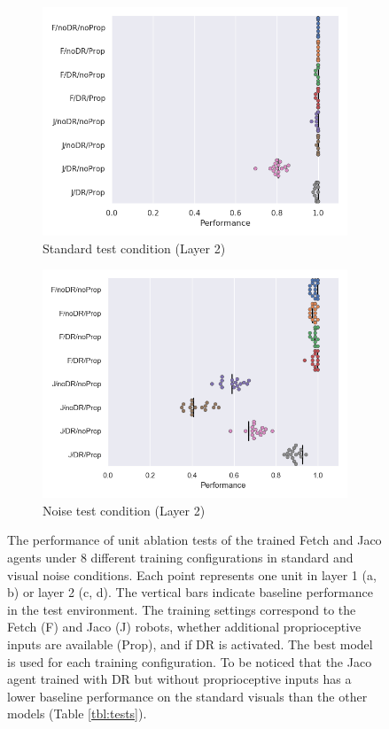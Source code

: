 \begin{figure}[h!]
  \begin{subfigure}{0.49\linewidth}
    \includegraphics[width=\textwidth]{figures/chapter6/unitablation/conv2_ablations}
    \caption{Standard test condition (Layer 2)}
  \end{subfigure}
  \begin{subfigure}{0.49\linewidth}
    \includegraphics[width=\textwidth]{figures/chapter6/unitablation/conv2_ablations_noisy}
    \caption{Noise test condition (Layer 2)}
  \end{subfigure}
  \caption[Test performance of unit ablation tests of the best models under 8 training configurations in standard and noise conditions.]{The performance of unit ablation tests of the trained Fetch and Jaco agents under 8 different training configurations in standard and visual noise conditions. Each point represents one unit in layer 1 (a, b) or layer 2 (c, d). The vertical bars indicate baseline performance in the test environment. The training settings correspond to the Fetch (F) and Jaco (J) robots, whether additional proprioceptive inputs are available (Prop), and if DR is activated. The best model is used for each training configuration. To be noticed that the Jaco agent trained with DR but without proprioceptive inputs has a lower baseline performance on the standard visuals than the other models (Table \ref{tbl:tests}).}
  \label{fig:unit_ablations}
\end{figure}
